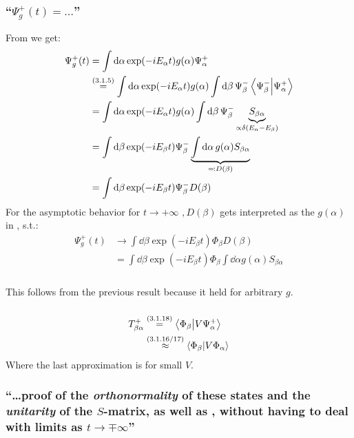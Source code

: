 \subsubsection{\enquote{$\Psi_g^+(t)=\dots$} }
From  we get:
\begin{align*}
	\Psi^+_g(t)&=\int \dd{\alpha} \exp(-iE_\alpha t) g(\alpha) \Psi_\alpha^+\\
	&\overset{({3.1.5})}{=}\int \dd{\alpha} \exp(-iE_\alpha t) g(\alpha) \int\dd{\beta} \Psi_\beta^- \braket{\Psi_\beta^-}{\Psi_\alpha^+}\\
	&=\int \dd{\alpha} \exp(-iE_\alpha t) g(\alpha) \int\dd{\beta} \Psi_\beta^- \underbrace{S_{\beta\alpha}}_{\propto \delta(E_\alpha-E_\beta)}\\
	&=\int \dd{\beta} \exp(-iE_\beta t)\Psi_\beta^-  \underbrace{\int\dd{\alpha} g(\alpha) S_{\beta\alpha}}_{\eqqcolon D(\beta)}\\
	&=\int \dd{\beta} \exp(-iE_\beta t)\Psi_\beta^-  D(\beta)
\end{align*}
For the asymptotic behavior for $t\rightarrow + \infty$ $, D(\beta)$ gets interpreted as the $g(\alpha)$ in , s.t.:
\begin{align*}
		\Psi^+_g(t)&\rightarrow \int \dd{\beta} \exp(-iE_\beta t)\Phi_\beta  D(\beta)\\
		&= \int \dd{\beta} \exp(-iE_\beta t)\Phi_\beta \int\dd{\alpha} g(\alpha) S_{\beta\alpha}
\end{align*}


\subsubsection{ }
This follows from the previous result because it held for arbitrary $g$.


\subsubsection{ }
\begin{align*}
	T_{\beta\alpha}^+&\overset{({3.1.18})}{=} \braket{\Phi_\beta}{V\Psi_\alpha^+}\\
	&\overset{({3.1.16/17})}{\approx}\braket{\Phi_\beta}{V\Phi_\alpha}
\end{align*}
Where the last approximation is for small $V$.


\subsubsection{\enquote{\dots proof of the \emph{orthonormality} of these states and the \emph{unitarity} of the $S$-matrix, as well as , without having to deal with limits as $t\rightarrow \mp\infty$} }

